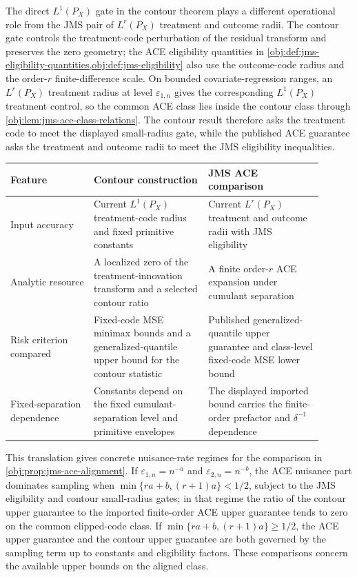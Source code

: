 The direct \(L^1(P_X)\) gate in the contour theorem plays a different operational role from the JMS pair of \(L^r(P_X)\) treatment and outcome radii. The contour gate controls the treatment-code perturbation of the residual transform and preserves the zero geometry; the ACE eligibility quantities in \cref{obj:def:jms-eligibility-quantities,obj:def:jms-eligibility} also use the outcome-code radius and the order-\(r\) finite-difference scale. On bounded covariate-regression ranges, an \(L^r(P_X)\) treatment radius at level \(\varepsilon_{1,n}\) gives the corresponding \(L^1(P_X)\) treatment control, so the common ACE class lies inside the contour class through \cref{obj:lem:jms-ace-class-relations}. The contour result therefore asks the treatment code to meet the displayed small-radius gate, while the published ACE guarantee asks the treatment and outcome radii to meet the JMS eligibility inequalities.

\begin{center}
\begin{tabular}{p{0.24\linewidth}p{0.33\linewidth}p{0.33\linewidth}}
\hline
Feature & Contour construction & JMS ACE comparison \\
\hline
Input accuracy & Current \(L^1(P_X)\) treatment-code radius and fixed primitive constants & Current \(L^r(P_X)\) treatment and outcome radii with JMS eligibility \\
Analytic resource & A localized zero of the treatment-innovation transform and a selected contour ratio & A finite order-\(r\) ACE expansion under cumulant separation \\
Risk criterion compared & Fixed-code MSE minimax bounds and a generalized-quantile upper bound for the contour statistic & Published generalized-quantile upper guarantee and class-level fixed-code MSE lower bound \\
Fixed-separation dependence & Constants depend on the fixed cumulant-separation level and primitive envelopes & The displayed imported bound carries the finite-order prefactor and \(\delta^{-1}\) dependence \\
\hline
\end{tabular}
\end{center}

This translation gives concrete nuisance-rate regimes for the comparison in \cref{obj:prop:jms-ace-alignment}. If \(\varepsilon_{1,n}=n^{-a}\) and \(\varepsilon_{2,n}=n^{-b}\), the ACE nuisance part dominates sampling when \(\min\{ra+b,(r+1)a\}<1/2\), subject to the JMS eligibility and contour small-radius gates; in that regime the ratio of the contour upper guarantee to the imported finite-order ACE upper guarantee tends to zero on the common clipped-code class. If \(\min\{ra+b,(r+1)a\}\ge1/2\), the ACE upper guarantee and the contour upper guarantee are both governed by the sampling term up to constants and eligibility factors. These comparisons concern the available upper bounds on the aligned class.


